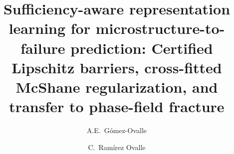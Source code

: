 \documentclass[preprint,11pt,a4paper]{elsarticle}
\begin{document}
\begin{frontmatter}

\title{Sufficiency-aware representation learning for microstructure-to-failure prediction: Certified Lipschitz barriers, cross-fitted McShane regularization, and transfer to phase-field fracture}

\author[ubu]{A.E.~G\'omez-Ovalle}
\author[puj]{C.~Ram\'irez Ovalle}

\address[ubu]{University of Burgos, Escuela Polit\'ecnica Superior, 09006 Burgos, Spain}
\address[puj]{Department of Natural Sciences \& Mathematics, Pontificia Universidad Javeriana -- Cali, Cali, Colombia}


\begin{abstract}

\end{abstract}
\end{frontmatter}
\end{document}
